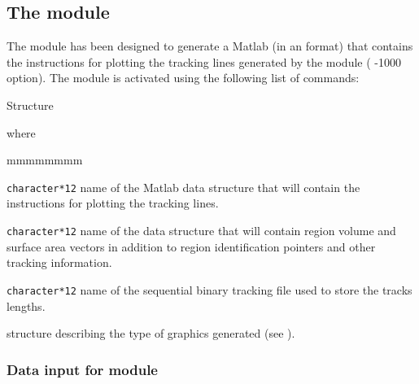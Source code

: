 \subsection{The  module}\label{sect:TLMData}

The  module has been designed to generate a Matlab  (in an  format) that contains the instructions for
plotting the tracking lines generated by the
 module ( -1000 option).\cite{Plamondon2006}  The  module is activated using the following list of commands:

\begin{DataStructure}{Structure }
 \moc{:=}      
\moc{::} 
\end{DataStructure}

\noindent
 where

\begin{ListeDeDescription}{mmmmmmmm}

\item[\dusa{MFILE}] \verb|character*12| name of the  Matlab  data structure that
will contain the instructions for plotting the tracking lines.

\item[\dusa{TRKNAM}] \verb|character*12| name of the  data structure that
will contain region volume and surface area vectors in addition to region
identification pointers and other tracking information.

\item[\dusa{TRKFIL}] \verb|character*12| name of the sequential binary tracking file 
used to store the tracks lengths.\cite{Marleau2001}  

\item[\dstr{desctlm}] structure describing the type of graphics generated (see ).

\end{ListeDeDescription}

\subsubsection{Data input for module }\label{sect:desctlm}


